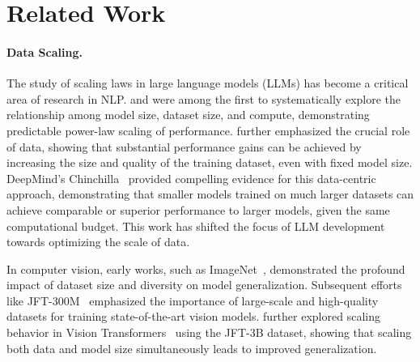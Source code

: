 \section{Related Work}\label{sect:related_work}

\paragraph{Data Scaling.}

The study of scaling laws in large language models (LLMs) has become a critical area of research in NLP. \citet{hestness2017deep} and \citet{kaplan2020scaling} were among the first to systematically explore the relationship among model size, dataset size, and compute, demonstrating predictable power-law scaling of performance. \citet{henighan2020scaling} further emphasized the crucial role of data, showing that substantial performance gains can be achieved by increasing the size and quality of the training dataset, even with fixed model size. DeepMind's Chinchilla~\citep{hoffmann2022training} provided compelling evidence for this data-centric approach, demonstrating that smaller models trained on much larger datasets can achieve comparable or superior performance to larger models, given the same computational budget. This work has shifted the focus of LLM development towards optimizing the scale of  data.

In computer vision, early works, such as ImageNet~\citep{deng2009imagenet}, demonstrated the profound impact of dataset size and diversity on model generalization. Subsequent efforts like JFT-300M~\citep{sun2017revisiting} emphasized the importance of large-scale and high-quality datasets for training state-of-the-art vision models. \citet{zhai2106scaling} further explored scaling behavior in Vision Transformers~\citep{dosovitskiy2020image} using the  JFT-3B dataset, showing that scaling both data and model size simultaneously leads to improved generalization.

